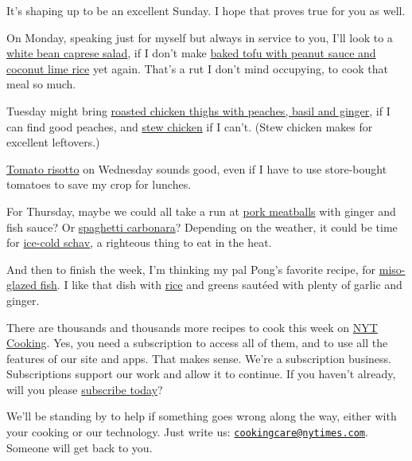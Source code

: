 It's shaping up to be an excellent Sunday. I hope that proves true for
you as well.

On Monday, speaking just for myself but always in service to you, I'll
look to a
\href{https://cooking.nytimes.com/recipes/1021273-white-bean-caprese-salad}{white
bean caprese salad}, if I don't make
\href{https://cooking.nytimes.com/recipes/1020530-baked-tofu-with-peanut-sauce-and-coconut-lime-rice}{baked
tofu with peanut sauce and coconut lime rice} yet again. That's a rut I
don't mind occupying, to cook that meal so much.

Tuesday might bring
\href{https://cooking.nytimes.com/recipes/1012681-roasted-chicken-thighs-with-peaches-basil-and-ginger}{roasted
chicken thighs with peaches, basil and ginger}, if I can find good
peaches, and
\href{https://cooking.nytimes.com/recipes/1017778-stew-chicken}{stew
chicken} if I can't. (Stew chicken makes for excellent leftovers.)

\href{https://cooking.nytimes.com/recipes/1020378-tomato-risotto}{Tomato
risotto} on Wednesday sounds good, even if I have to use store-bought
tomatoes to save my crop for lunches.

For Thursday, maybe we could all take a run at
\href{https://cooking.nytimes.com/recipes/1019764-pork-meatballs-with-ginger-and-fish-sauce}{pork
meatballs} with ginger and fish sauce? Or
\href{https://cooking.nytimes.com/recipes/12965-spaghetti-carbonara}{spaghetti
carbonara}? Depending on the weather, it could be time for
\href{https://cooking.nytimes.com/recipes/1018801-ice-cold-schav}{ice-cold
schav}, a righteous thing to eat in the heat.

And then to finish the week, I'm thinking my pal Pong's favorite recipe,
for
\href{https://cooking.nytimes.com/recipes/1015115-miso-glazed-fish}{miso-glazed
fish}. I like that dish with
\href{https://cooking.nytimes.com/guides/49-how-to-make-rice}{rice} and
greens sautéed with plenty of garlic and ginger.

There are thousands and thousands more recipes to cook this week on
\href{https://cooking.nytimes.com/}{NYT Cooking}. Yes, you need a
subscription to access all of them, and to use all the features of our
site and apps. That makes sense. We're a subscription business.
Subscriptions support our work and allow it to continue. If you haven't
already, will you please
\href{https://www.nytimes.com/subscription/cooking.html?campaignId=6XQHR}{subscribe
today}?

We'll be standing by to help if something goes wrong along the way,
either with your cooking or our technology. Just write us:
\href{mailto:cookingcare@nytimes.com}{\nolinkurl{cookingcare@nytimes.com}}.
Someone will get back to you.

